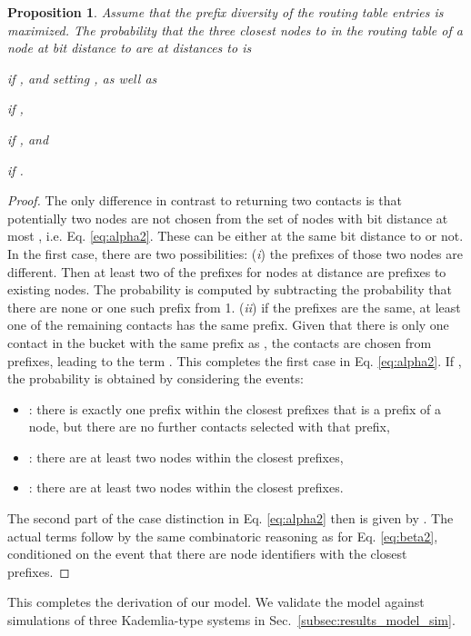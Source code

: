 \documentclass[10pt, conference, compsocconf, letterpaper]{IEEEtran}
\newtheorem{proposition}{Proposition}
\begin{document}
\vspace{3pt}
\begin{proposition}
\label{prop:s4}
Assume that the prefix diversity of the routing table entries is maximized.
The probability that the three closest nodes to  in the routing table of a node 
at bit distance  to  are at distances  to  is

if , and setting , 
as well as


if , 

if , and

if .
\end{proposition}
 \begin{proof}
 The only difference in contrast to returning two contacts is that potentially two nodes
 are not chosen from the set of nodes with bit distance at most , i.e.
 Eq. \ref{eq:alpha2}.
 These can be either at the same bit distance to  or not.
 In the first case, there are two possibilities: (\emph{i}) the prefixes of
 those two nodes are different. Then  at least two of the
  prefixes for nodes at distance  are 
 prefixes to existing nodes. 
 The probability is computed by subtracting the probability that there
 are none or one such prefix from 1. (\emph{ii}) if the prefixes are the same, at least one of the  remaining contacts 
  has the same prefix. Given that there is only one contact in the bucket with the
  same prefix as , the  contacts are chosen from  prefixes,
  leading to the term .
  This completes the first case in Eq. \ref{eq:alpha2}. If , the probability is obtained by considering
  the events:
  \begin{itemize}
  \item : there is exactly one prefix within the  closest prefixes
  that is a prefix of a node, but there are no further contacts selected with that prefix,
  \item : there are at least two nodes within the  closest prefixes,
  \item : there are at least two nodes within the  closest prefixes.
  \end{itemize}
  The second part of the case distinction in Eq. \ref{eq:alpha2} then is given by
  . The actual terms follow by the same combinatoric reasoning as for Eq. \ref{eq:beta2}, conditioned   on the event that there are node identifiers with the closest  prefixes. \end{proof}
  
This completes the derivation of our model. We validate the model against simulations of three Kademlia-type systems in Sec.~\ref{subsec:results_model_sim}.
\end{document}
